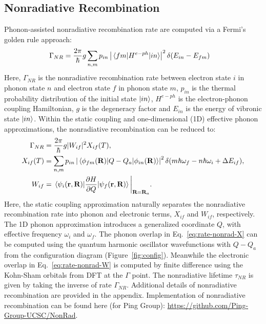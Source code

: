 \subsection{Nonradiative Recombination}
Phonon-assisted nonradiative recombination rate are computed via a Fermi's golden rule approach:
\begin{align}
    \Gamma_{NR} &= \frac{2\pi}{\hbar}g\sum_{n,m}p_{in}\left|\mel{fm}{H^{e-ph}}{in}\right|^2\delta(E_{in}-E_{fm}) \label{intro:eq:nonrad-full}
\end{align}
Here, $\Gamma_{NR}$ is the nonradiative recombination rate between electron state $i$ in phonon state $n$ and electron state $f$ in phonon state $m$, $p_{in}$ is the thermal probability distribution of the initial state $\ket{in}$, $H^{e-ph}$ is the electron-phonon coupling Hamiltonian, $g$ is the degeneracy factor and $E_{in}$ is the energy of vibronic state $\ket{in}$. Within the static coupling and one-dimensional (1D) effective phonon approximations, the nonradiative recombination can be reduced to:
\begin{align}
    \Gamma_{NR} &= \frac{2\pi}{\hbar}g|W_{if}|^2 X_{if}(T), \label{intro:eq:nonrad}\\
    X_{if}(T) &= \sum_{n,m}p_{in}\left|\mel{\phi_{fm}(\textbf{R})}{Q-Q_a}{\phi_{in}(\mathbf{R})}\right|^2 \delta(m\hbar\omega_f - n\hbar\omega_i+\Delta E_{if}), \label{intro:eq:nonrad-X} \\
    W_{if} &= \mel{\psi_i(\mathbf{r}, \textbf{R})}{\frac{\partial H}{\partial Q}}{\psi_f(\mathbf{r},\textbf{R})}\bigg{|}_{\textbf{R}=\textbf{R}_a}. \label{intro:eq:nonrad-W}
\end{align}
Here, the static coupling approximation naturally separates the nonradiative recombination rate into phonon and electronic terms, $X_{if}$ and $W_{if}$, respectively. The 1D phonon approximation introduces a generalized coordinate $Q$, with effective frequency $\omega_i$ and $\omega_f$. The phonon overlap in Eq.~\ref{eq:rate-nonrad-X} can be computed using the quantum harmonic oscillator wavefunctions with $Q-Q_a$ from the configuration diagram (Figure~\ref{fig:config}). Meanwhile the electronic overlap in Eq.~\ref{eq:rate-nonrad-W} is computed by finite difference using the Kohn-Sham orbitals from DFT at the $\Gamma$ point. The nonradiative lifetime $\tau_{NR}$ is given by taking the inverse of rate $\Gamma_{NR}$. Additional details of nonradiative recombination are provided in the appendix. Implementation of nonradiative recombination can be found here (for Ping Group): \url{https://github.com/Ping-Group-UCSC/NonRad}.


